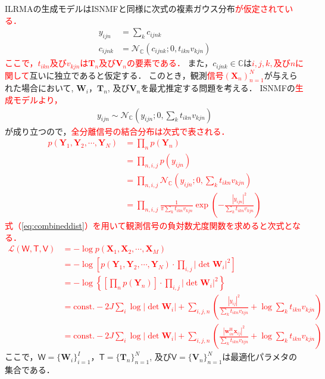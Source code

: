 ILRMAの生成モデルはISNMFと同様に次式の複素ガウス分布\textcolor{red}{が仮定されている．}
\begin{align}
    y_{ijn} &= \sum_k c_{ijnk} \\
    c_{ijnk} &= \mathcal{N}_{\mathbb{C}}(c_{ijnk}; 0, t_{ikn} v_{kjn}) \label{eq:ilrma_gen}
\end{align}
\textcolor{red}{ここで，$t_{ikn}$及び$v_{kjn}$は$\bm{T}_n$及び$\bm{V}_n$の要素である．}
また，$c_{ijnk} \in \mathbb{C}$は\textcolor{red}{$i, j, k, $及び$n$に関して}互いに独立であると仮定する．
このとき，観測\textcolor{red}{信号$(\bm{X}_n)_{n=1}^N$}が与えられた場合において, $\bm{W}_i$，$\bm{T}_n$, 及び$\bm{V}_n$を最尤推定する問題を考える．
ISNMFの\textcolor{red}{生成モデルより，}
\begin{align}
    y_{ijn} \sim \mathcal{N}_{\mathbb{C}}\left(y_{ijn};  0, \sum_k t_{ikn} v_{kjn} \right) 
　　\label{eq:ISNMFmodel}
\end{align}
が成り立つので，\textcolor{red}{全分離信号の結合分布は次式で表される．}
\textcolor{red}{
\begin{align}
    \nonumber p(\bm{Y}_1, \bm{Y}_2, \cdots, \bm{Y}_N) &= \prod_n p(\bm{Y}_n) \\
\nonumber &= \prod_{n, i, j} p(y_{ijn}) \\
\nonumber &= \prod_{n, i, j} \mathcal{N}_{\mathbb{C}} \left(y_{ijn}; 0, \sum_k t_{ikn}v_{kjn} \right) \\
&= \prod_{n, i, j} \frac{1}{\pi \sum_k t_{ikn}v_{kjn}} \exp \left( -\frac{|y_{ijn}|^2}{\sum_k t_{ikn}v_{kjn}} \right) \label{eq:combineddist}
\end{align}}
\textcolor{red}{式（\ref{eq:combineddist}）を用いて観測信号の負対数尤度関数を求めると次式となる．}
\textcolor{red}{
\begin{align}
　　\nonumber \mathcal{L}(\mathsf{W, T, V}) &= - \log p(\bm{X}_1, \bm{X}_2, \cdots, \bm{X}_M) \\
    \nonumber &= -\log \left[p(\bm{Y}_1, \bm{Y}_2, \cdots, \bm{Y}_N) \cdot \prod_{i, j} |\det \bm{W}_i|^2\right] \\
    \nonumber &= -\log \left \{ \left[\prod_n p(\bm{Y}_n) \right] \cdot \prod_{i, j} |\det \bm{W}_i|^2\right \} \\
    \nonumber &= \mathrm{const.}- 2J \sum_{i}  \log |\det \bm{W}_i| +\sum_{i,j,n} \left( \frac{|y_{ij}|^2}{\sum_k t_{ikn} v_{kjn}} + \log \sum_k t_{ikn} v_{kjn}\right) \\
    &= \mathrm{const.}-2J \sum_i \log | \det \bm{W}_i | + \sum_{i,j,n} \left( \frac{|\bm{w}_{in}^{\mathrm{H}}\bm{x}_{ij}|^2}{\sum_k t_{ikn}v_{kjn}} + \log \sum_k t_{ikn}v_{kjn} \right)
    \label{eq:ilrmalike2}
\end{align}}
ここで，$\mathsf{W}=\{ \bm{W}_i \}_{i=1}^I$，$\mathsf{T}=\{ \bm{T}_n \}_{n=1}^N$, 及び$\mathsf{V}=\{ \bm{V}_n \}_{n=1}^N$は最適化パラメタの集合である．

